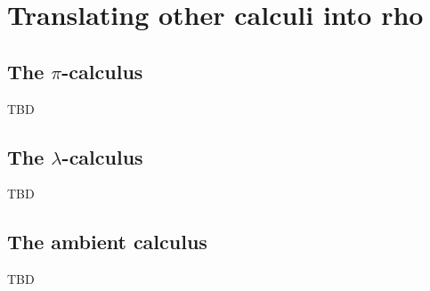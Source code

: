 \section{Translating other calculi into rho}

\subsection{The $\pi$-calculus}

TBD

\subsection{The $\lambda$-calculus}

TBD

\subsection{The ambient calculus}

TBD

